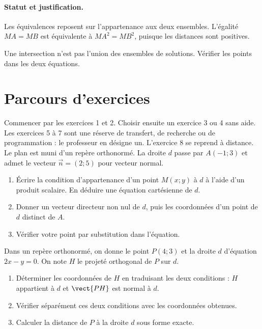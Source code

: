 \paragraph{Statut et justification.} Les équivalences reposent sur l’appartenance aux deux ensembles. L’égalité $MA=MB$ est équivalente à $MA^2=MB^2$, puisque les distances sont positives.
\label{C07-EX4}
\begin{erreur}Une intersection n’est pas l’union des ensembles de solutions. Vérifier les points dans les deux équations.\end{erreur}
\label{C07-AP4}
\section*{Parcours d’exercices}\label{C07-PARC}
Commencer par les exercices 1 et 2. Choisir ensuite un exercice 3 ou 4 sans aide. Les exercices 5 à 7 sont une réserve de transfert, de recherche ou de programmation : le professeur en désigne un. L’exercice 8 se reprend à distance.
\begingroup
{}
Le plan est muni d’un repère orthonormé. La droite $d$ passe par $A(-1;3)$ et admet le vecteur $\vec n=(2;5)$ pour vecteur normal.
\begin{enumerate}[label=\arabic*.]
\item Écrire la condition d’appartenance d’un point $M(x;y)$ à $d$ à l’aide d’un produit scalaire. En déduire une équation cartésienne de $d$.
\item Donner un vecteur directeur non nul de $d$, puis les coordonnées d’un point de $d$ distinct de $A$.
\item Vérifier votre point par substitution dans l’équation.
\end{enumerate}
Dans un repère orthonormé, on donne le point $P(4;3)$ et la droite $d$ d’équation $2x-y=0$. On note $H$ le projeté orthogonal de $P$ sur $d$.
\begin{enumerate}[label=\arabic*.]
\item Déterminer les coordonnées de $H$ en traduisant les deux conditions : $H$ appartient à $d$ et $\vect{PH}$ est normal à $d$.
\item Vérifier séparément ces deux conditions avec les coordonnées obtenues.
\item Calculer la distance de $P$ à la droite $d$ sous forme exacte.
\end{enumerate}
